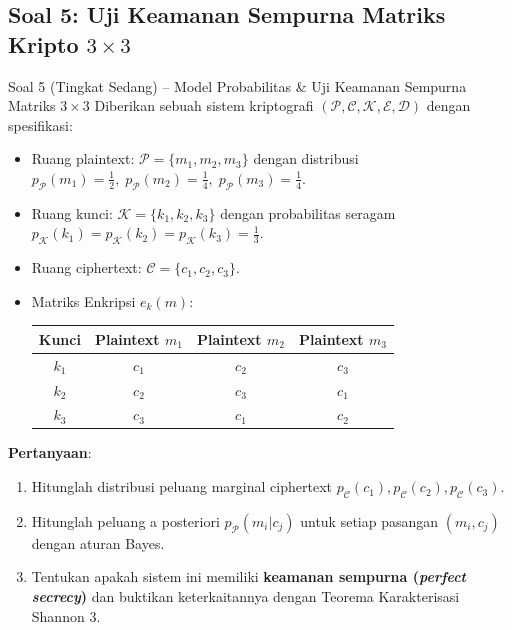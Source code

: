 \documentclass[11pt,a4paper]{article}
\begin{document}
\subsection{Soal 5: Uji Keamanan Sempurna Matriks Kripto \texorpdfstring{$3 \times 3$}{3x3}}

\begin{soalsedang}{Soal 5 (Tingkat Sedang) -- Model Probabilitas \& Uji Keamanan Sempurna Matriks $3 \times 3$}
Diberikan sebuah sistem kriptografi $(\mathcal{P}, \mathcal{C}, \mathcal{K}, \mathcal{E}, \mathcal{D})$ dengan spesifikasi:
\begin{itemize}
    \item Ruang plaintext: $\mathcal{P} = \{m_1, m_2, m_3\}$ dengan distribusi $p_{\mathcal{P}}(m_1) = \frac{1}{2}, \; p_{\mathcal{P}}(m_2) = \frac{1}{4}, \; p_{\mathcal{P}}(m_3) = \frac{1}{4}$.
    \item Ruang kunci: $\mathcal{K} = \{k_1, k_2, k_3\}$ dengan probabilitas seragam $p_{\mathcal{K}}(k_1) = p_{\mathcal{K}}(k_2) = p_{\mathcal{K}}(k_3) = \frac{1}{3}$.
    \item Ruang ciphertext: $\mathcal{C} = \{c_1, c_2, c_3\}$.
    \item Matriks Enkripsi $e_k(m)$:
    \begin{center}
    \begin{tabular}{c|ccc}
    \toprule
    Kunci & Plaintext $m_1$ & Plaintext $m_2$ & Plaintext $m_3$ \\
    \midrule
    $k_1$ & $c_1$ & $c_2$ & $c_3$ \\
    $k_2$ & $c_2$ & $c_3$ & $c_1$ \\
    $k_3$ & $c_3$ & $c_1$ & $c_2$ \\
    \bottomrule
    \end{tabular}
    \end{center}
\end{itemize}
\textbf{Pertanyaan}:
\begin{enumerate}[label=\alph*)]
    \item Hitunglah distribusi peluang marginal ciphertext $p_{\mathcal{C}}(c_1), p_{\mathcal{C}}(c_2), p_{\mathcal{C}}(c_3)$.
    \item Hitunglah peluang a posteriori $p_{\mathcal{P}}(m_i | c_j)$ untuk setiap pasangan $(m_i, c_j)$ dengan aturan Bayes.
    \item Tentukan apakah sistem ini memiliki \textbf{keamanan sempurna (\textit{perfect secrecy})} dan buktikan keterkaitannya dengan Teorema Karakterisasi Shannon 3.
\end{enumerate}
\end{soalsedang}
\end{document}
